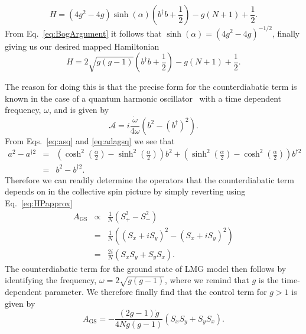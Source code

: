 \begin{equation}
H=\left( 4g^2 -4g \right) \sinh \left(\alpha\right) \left(b^\dagger b + \frac{1}{2}\right) - g\left(N+1\right) +\frac{1}{2}.
\end{equation}
From Eq.~\eqref{eq:BogArgument} it follows that $\sinh \left(\alpha\right) = \left( 4 g^2 - 4g \right)^{-1/2}$, finally giving us our desired mapped Hamiltonian
\begin{equation}
\label{eq:LMGho}
H = 2\sqrt{g(g-1)} \left(b^\dagger b + \frac{1}{2} \right) - g(N+1) + \frac{1}{2}.
\end{equation}

The reason for doing this is that the precise form for the counterdiabatic term is known in the case of a quantum harmonic oscillator~\cite{MugaJPB} with a time dependent frequency, $\omega$, and is given by
\begin{equation}
\label{eq:CDqho}
\mathcal{A} = i \frac{\dot \omega}{4\omega} \left( b^2 - (b^\dagger)^2 \right).
\end{equation}
From Eqs.~\eqref{eq:asq} and \eqref{eq:adagsq} we see that
\begin{eqnarray}
a^2-a^{\dagger2} &=&  \left(\cosh^2\left(\frac{\alpha}{2}\right) - \sinh^2\left(\frac{\alpha}{2}\right) \right) b^2 + \left(\sinh^2\left(\frac{\alpha}{2}\right) - \cosh^2\left(\frac{\alpha}{2}\right) \right) b^{\dagger2} \nonumber \\
&=& b^2-b^{\dagger2}.
\end{eqnarray}
Therefore we can readily determine the operators that the counterdiabatic term depends on in the collective spin picture by simply reverting using Eq.~\eqref{eq:HPapprox}
\begin{eqnarray}
A_\text{GS} &\propto& \frac{1}{N} \left(S_+^2 - S_-^2 \right) \label{eq:propto} \\
 &=& \frac{1}{N}\left( \left(S_x+i S_y\right)^2 -  \left(S_x+i S_y\right)^2 \right) \nonumber \\
 &=& \frac{2i}{N}\left( S_xS_y + S_yS_x \right). \nonumber
\end{eqnarray}
The counterdiabatic term for the ground state of LMG model then follows by identifying the frequency, $\omega=2\sqrt{g(g-1)}$, where we remind that $g$ is the time-dependent parameter. We therefore finally find that the control term for $g>1$ is given by
\begin{equation}
\label{eq:LMGCDterm}
A_\text{GS} = -\frac{\left(2 g -1 \right) \dot g}{4N g\left(g-1 \right)} \left( S_xS_y + S_yS_x \right).
\end{equation}
